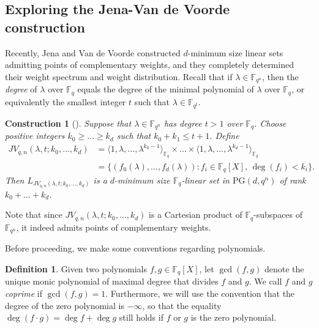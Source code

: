 \documentclass[11pt]{article}
\newtheorem{construction}[theorem]{Construction}
\theoremstyle{definition}
\newtheorem{definition}[theorem]{Definition}
\newcommand{\fqn}{\mathbb{F}_{q^n}}
\newcommand{\F}{{\mathbb F}}
\newcommand{\fq}{{\mathbb F}_{q}}
\newcommand{\PG}{\mathrm{PG}}
\newcommand{\pg}{\PG}
\begin{document}
\subsection{Exploring the Jena-Van de Voorde construction}

Recently, Jena and Van de Voorde constructed $d$-minimum size linear sets admitting points of complementary weights, and they completely determined their weight spectrum and weight distribution.
Recall that if $\lambda \in \fqn$, then the \emph{degree} of $\lambda$ over $\fq$ equals the degree of the minimal polynomial of $\lambda$ over $\fq$, or equivalently the smallest integer $t$ such that $\lambda \in \F_{q^t}$.

\begin{construction}[{\cite[Theorem 2.17]{Jena2021onlinearsets}}] 
 \label{cs:constructionVdV}
Suppose that $\lambda \in \fqn$ has degree $t > 1$ over $\fq$.
Choose positive integers $k_0 \geq \ldots \geq k_d$ such that $k_0 + k_1 \leq t+1$.
Define
\begin{align*}
 JV_{q,n}(\lambda,t;k_0,\dots,k_d) &= \langle 1 ,\lambda,\ldots, \lambda^{k_0-1} \rangle_{\F_q} \times \ldots \times \langle 1 ,\lambda,\ldots, \lambda^{k_d-1} \rangle_{\F_q} \\
   &= \{ (f_0(\lambda), \dots, f_d(\lambda)) \colon f_i \in \fq[X], \, \deg(f_i) < k_i \}.
\end{align*}
Then $L_{JV_{q,n}(\lambda,t;k_0,\dots,k_d)}$ is a $d$-minimum size $\fq$-linear set in $\pg(d,q^n)$ of rank {$k_0 + \ldots + k_{d}$}.
\end{construction}

Note that since $JV_{q,n}(\lambda,t;k_0,\ldots,k_d)$ is a Cartesian product of $\F_q$-subspaces of $\F_{q^n}$, it indeed admits points of complementary weights.

Before proceeding, we make some conventions regarding polynomials.

\begin{definition}
 Given two polynomials $f, g \in \fq[X]$, let $\gcd(f,g)$ denote the unique monic polynomial of maximal degree that divides $f$ and $g$.
 We call $f$ and $g$ \emph{coprime} if $\gcd(f,g) = 1$.
 Furthermore, we will use the convention that the degree of the zero polynomial is $-\infty$, so that the equality $\deg(f \cdot g) = \deg f + \deg g$ still holds if $f$ or $g$ is the zero polynomial.
\end{definition}
\end{document}
